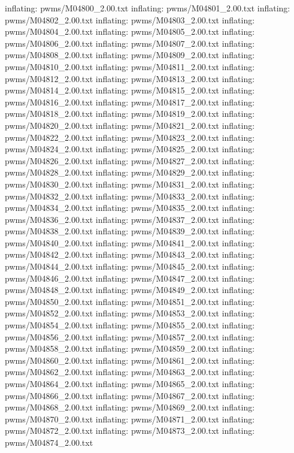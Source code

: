 \documentclass[letterpaper,10pt,english]{sphinxmanual}
\begin{document}
{\begin{sphinxVerbatim}[commandchars=\\\{\}]
  inflating: pwms/M04800\_2.00.txt
  inflating: pwms/M04801\_2.00.txt
  inflating: pwms/M04802\_2.00.txt
  inflating: pwms/M04803\_2.00.txt
  inflating: pwms/M04804\_2.00.txt
  inflating: pwms/M04805\_2.00.txt
  inflating: pwms/M04806\_2.00.txt
  inflating: pwms/M04807\_2.00.txt
  inflating: pwms/M04808\_2.00.txt
  inflating: pwms/M04809\_2.00.txt
  inflating: pwms/M04810\_2.00.txt
  inflating: pwms/M04811\_2.00.txt
  inflating: pwms/M04812\_2.00.txt
  inflating: pwms/M04813\_2.00.txt
  inflating: pwms/M04814\_2.00.txt
  inflating: pwms/M04815\_2.00.txt
  inflating: pwms/M04816\_2.00.txt
  inflating: pwms/M04817\_2.00.txt
  inflating: pwms/M04818\_2.00.txt
  inflating: pwms/M04819\_2.00.txt
  inflating: pwms/M04820\_2.00.txt
  inflating: pwms/M04821\_2.00.txt
  inflating: pwms/M04822\_2.00.txt
  inflating: pwms/M04823\_2.00.txt
  inflating: pwms/M04824\_2.00.txt
  inflating: pwms/M04825\_2.00.txt
  inflating: pwms/M04826\_2.00.txt
  inflating: pwms/M04827\_2.00.txt
  inflating: pwms/M04828\_2.00.txt
  inflating: pwms/M04829\_2.00.txt
  inflating: pwms/M04830\_2.00.txt
  inflating: pwms/M04831\_2.00.txt
  inflating: pwms/M04832\_2.00.txt
  inflating: pwms/M04833\_2.00.txt
  inflating: pwms/M04834\_2.00.txt
  inflating: pwms/M04835\_2.00.txt
  inflating: pwms/M04836\_2.00.txt
  inflating: pwms/M04837\_2.00.txt
  inflating: pwms/M04838\_2.00.txt
  inflating: pwms/M04839\_2.00.txt
  inflating: pwms/M04840\_2.00.txt
  inflating: pwms/M04841\_2.00.txt
  inflating: pwms/M04842\_2.00.txt
  inflating: pwms/M04843\_2.00.txt
  inflating: pwms/M04844\_2.00.txt
  inflating: pwms/M04845\_2.00.txt
  inflating: pwms/M04846\_2.00.txt
  inflating: pwms/M04847\_2.00.txt
  inflating: pwms/M04848\_2.00.txt
  inflating: pwms/M04849\_2.00.txt
  inflating: pwms/M04850\_2.00.txt
  inflating: pwms/M04851\_2.00.txt
  inflating: pwms/M04852\_2.00.txt
  inflating: pwms/M04853\_2.00.txt
  inflating: pwms/M04854\_2.00.txt
  inflating: pwms/M04855\_2.00.txt
  inflating: pwms/M04856\_2.00.txt
  inflating: pwms/M04857\_2.00.txt
  inflating: pwms/M04858\_2.00.txt
  inflating: pwms/M04859\_2.00.txt
  inflating: pwms/M04860\_2.00.txt
  inflating: pwms/M04861\_2.00.txt
  inflating: pwms/M04862\_2.00.txt
  inflating: pwms/M04863\_2.00.txt
  inflating: pwms/M04864\_2.00.txt
  inflating: pwms/M04865\_2.00.txt
  inflating: pwms/M04866\_2.00.txt
  inflating: pwms/M04867\_2.00.txt
  inflating: pwms/M04868\_2.00.txt
  inflating: pwms/M04869\_2.00.txt
  inflating: pwms/M04870\_2.00.txt
  inflating: pwms/M04871\_2.00.txt
  inflating: pwms/M04872\_2.00.txt
  inflating: pwms/M04873\_2.00.txt
  inflating: pwms/M04874\_2.00.txt

\end{sphinxVerbatim}}
\end{document}
